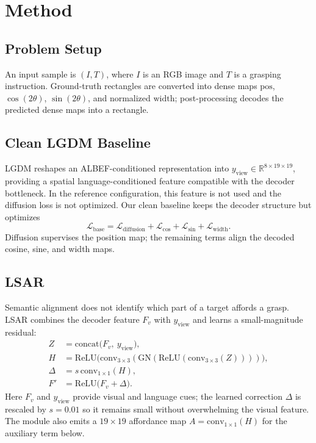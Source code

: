 \documentclass[10pt,twocolumn,letterpaper]{article}
\begin{document}
\section{Method}
\subsection{Problem Setup}
An input sample is $(I,T)$, where $I$ is an RGB image and $T$ is a grasping
instruction.  Ground-truth rectangles are converted into dense maps
$\mathrm{pos}$, $\cos(2\theta)$, $\sin(2\theta)$, and normalized
$\mathrm{width}$; post-processing decodes the predicted dense maps into a
rectangle.

\subsection{Clean LGDM Baseline}
LGDM reshapes an ALBEF-conditioned representation into
$y_{\mathrm{view}}\in\mathbb{R}^{8\times19\times19}$, providing a spatial
language-conditioned feature compatible with the decoder bottleneck.  In the
reference configuration, this feature is not used and the diffusion loss is
not optimized.  Our clean baseline keeps the decoder structure but optimizes
\begin{equation}
  \mathcal{L}_{\mathrm{base}} =
  \mathcal{L}_{\mathrm{diffusion}}
  + \mathcal{L}_{\cos}
  + \mathcal{L}_{\sin}
  + \mathcal{L}_{\mathrm{width}}.
  \label{eq:base}
\end{equation}
Diffusion supervises the position map; the remaining terms align the decoded
cosine, sine, and width maps.

\subsection{LSAR}
Semantic alignment does not identify which part of a target affords a grasp.
LSAR combines the decoder feature $F_v$ with $y_{\mathrm{view}}$ and learns a
small-magnitude residual:
\begin{align}
  Z &= \mathrm{concat}\bigl(F_v,\ y_{\mathrm{view}}\bigr), \\
  H &= \mathrm{ReLU}\bigl(\mathrm{conv}_{3\times3}(
        \mathrm{GN}(\mathrm{ReLU}(
          \mathrm{conv}_{3\times3}(Z))))\bigr), \\
  \Delta &= s\,\mathrm{conv}_{1\times1}(H), \\
  F' &= \mathrm{ReLU}\bigl(F_v+\Delta\bigr).
\end{align}
Here $F_v$ and $y_{\mathrm{view}}$ provide visual and language cues; the
learned correction $\Delta$ is rescaled by $s=0.01$ so it remains small
without overwhelming the visual feature.  The module also emits a $19\times19$
affordance map $A=\mathrm{conv}_{1\times1}(H)$ for the auxiliary term below.
\end{document}
